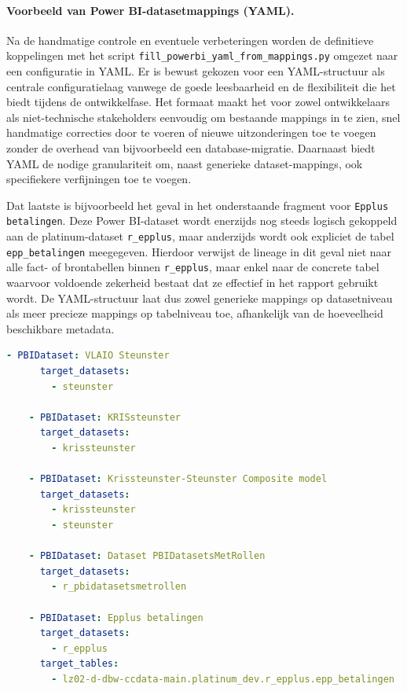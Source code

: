 \paragraph{Voorbeeld van Power BI-datasetmappings (YAML).}

Na de handmatige controle en eventuele verbeteringen worden de definitieve koppelingen met het script \texttt{fill\_powerbi\_yaml\_from\_mappings.py} omgezet naar een configuratie in YAML. Er is bewust gekozen voor een YAML-structuur als centrale configuratielaag vanwege de goede leesbaarheid en de flexibiliteit die het biedt tijdens de ontwikkelfase. Het formaat maakt het voor zowel ontwikkelaars als niet-technische stakeholders eenvoudig om bestaande mappings in te zien, snel handmatige correcties door te voeren of nieuwe uitzonderingen toe te voegen zonder de overhead van bijvoorbeeld een database-migratie. Daarnaast biedt YAML de nodige granulariteit om, naast generieke dataset-mappings, ook specifiekere verfijningen toe te voegen.

Dat laatste is bijvoorbeeld het geval in het onderstaande fragment voor \texttt{Epplus betalingen}. Deze Power BI-dataset wordt enerzijds nog steeds logisch gekoppeld aan de platinum-dataset \texttt{r\_epplus}, maar anderzijds wordt ook expliciet de tabel \texttt{epp\_betalingen} meegegeven. Hierdoor verwijst de lineage in dit geval niet naar alle fact- of brontabellen binnen \texttt{r\_epplus}, maar enkel naar de concrete tabel waarvoor voldoende zekerheid bestaat dat ze effectief in het rapport gebruikt wordt. De YAML-structuur laat dus zowel generieke mappings op datasetniveau als meer precieze mappings op tabelniveau toe, afhankelijk van de hoeveelheid beschikbare metadata.

\begin{lstlisting}[language=YAML, caption={Fragment uit PowerBI\_Dataset\_Mappings.yml}, label={lst:yaml-pbi}]
	- PBIDataset: VLAIO Steunster
	  target_datasets:
		- steunster
	
	- PBIDataset: KRISsteunster
	  target_datasets:
		- krissteunster
	
	- PBIDataset: Krissteunster-Steunster Composite model
	  target_datasets:
		- krissteunster
		- steunster
	
	- PBIDataset: Dataset PBIDatasetsMetRollen
	  target_datasets:
		- r_pbidatasetsmetrollen
		
	- PBIDataset: Epplus betalingen
	  target_datasets:
		- r_epplus
	  target_tables:
		- lz02-d-dbw-ccdata-main.platinum_dev.r_epplus.epp_betalingen
	
\end{lstlisting}

